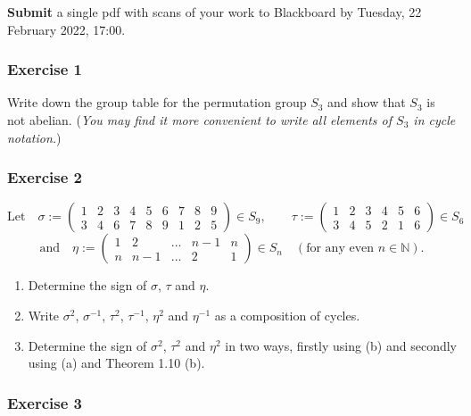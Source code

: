 \documentclass[
  12pt,
  a4paper,
  twoside]{article}
\theoremstyle{plain}
\theoremstyle{definition}
\begin{document}
\textbf{Submit} a single pdf with scans of your work to Blackboard by Tuesday, 22 February 2022, 17:00.

\hypertarget{exercise-1-2}{%
\subsubsection*{Exercise 1}\label{exercise-1-2}}

Write down the group table for the permutation group \(S_3\) and show that \(S_3\)
is not abelian.
(\emph{You may find it more convenient to write all elements of \(S_3\) in cycle
notation.})

\hypertarget{exercise-2-2}{%
\subsubsection*{Exercise 2}\label{exercise-2-2}}

\[\textrm{Let}\quad \sigma:=
\left(\begin{array}{ccccccccc}1&2&3&4&5&6&7&8&9\\3&4&6&7&8&9&1&2&5\end{array}\right)
\in S_9, \qquad \tau :=
\left(\begin{array}{cccccc}1&2&3&4&5&6\\3&4&5&2&1&6\end{array}\right)
\in S_6\]
\[\textrm{and} \quad \eta := \left(\begin{array}{ccccc}1& 2& \ldots & n-1 & n \\n&
n-1& \ldots & 2 & 1\end{array}\right) \in S_n \quad (\textrm{for
any even } n \in \mathbb{N}).\]

\begin{enumerate}
\def\labelenumi{(\alph{enumi})}
\item
  Determine the sign of \(\sigma\), \(\tau\) and \(\eta\).
\item
  Write \(\sigma^2\), \(\sigma^{-1}\), \(\tau^2\), \(\tau^{-1}\),
  \(\eta^2\) and \(\eta^{-1}\) as a composition of cycles.
\item
  Determine the sign of \(\sigma^2\), \(\tau^2\) and \(\eta^2\) in
  two ways, firstly using (b) and secondly using (a) and
  Theorem 1.10 (b).
\end{enumerate}

\hypertarget{exercise-3-2}{%
\subsubsection*{Exercise 3}\label{exercise-3-2}}
\end{document}
